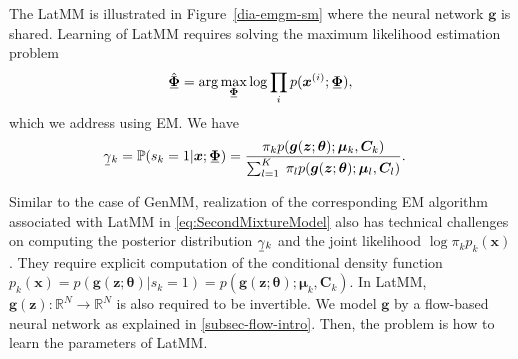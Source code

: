 The LatMM is illustrated in Figure~\ref{dia-emgm-sm} where the neural network $\bm{g}$ is shared. Learning of LatMM requires solving the maximum likelihood estimation problem
\begin{equation}
  \ubar{\hat{\bm{\Phi}}} =    \arg \max_{\ubar{\bm{\Phi}}} \log \prod_{i} p(\bm{x}^{(i)};\ubar{\bm{\Phi}}),
\end{equation}
which we address using EM.
We have
\begin{align}\label{eq-latMM-gamma}
  \hspace{-9pt}\ubar{\gamma}_k = \PP(s_k =1|\bm{x};\ubar{\bm{\Phi}})  
  = \frac{\pi_k p(\bm{g}(\bm{z};\bm{\theta});\bm{\mu}_k, \bm{C}_k)}{\sum_{l=1}^K\; \pi_l p(\bm{g}(\bm{z};\bm{\theta});\bm{\mu}_l, \bm{C}_l)}.
\end{align}

Similar to the case of GenMM, realization of the corresponding EM
algorithm associated with LatMM in \autoref{eq:SecondMixtureModel}
also has technical challenges on computing the posterior distribution $\ubar{\gamma}_k$ and the joint likelihood $\log{\pi_k p_k(\bm{x})}$. They require explicit computation of the conditional density function $p_k(\bm{x}) = p(\bm{g}(\bm{z};\bm{\theta})| s_k=1) = p(\bm{g}(\bm{z};\bm{\theta});\bm{\mu}_k, \bm{C}_k) $. In LatMM, $\bm{g}(\bm{z}): \mathbb{R}^N \rightarrow \mathbb{R}^N$ is also required to be invertible. We model $\bm{g}$ by a flow-based neural network as explained in \autoref{subsec-flow-intro}.
Then, the problem is how to learn the parameters of LatMM. 
